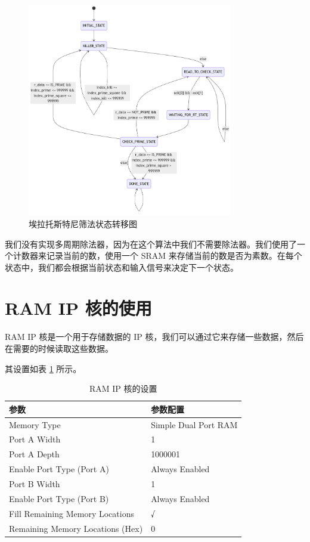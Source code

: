 \documentclass[a4paper]{article}
\begin{document}
\begin{figure}[H]
\centering
\includegraphics[width=0.8\textwidth]{./image/2/state.png}
\caption{埃拉托斯特尼筛法状态转移图}
\label{fig:state.png}
\end{figure}

我们没有实现多周期除法器，因为在这个算法中我们不需要除法器。我们使用了一个计数器来记录当前的数，使用一个 SRAM 来存储当前的数是否为素数。在每个状态中，我们都会根据当前状态和输入信号来决定下一个状态。

\section{RAM IP 核的使用}

RAM IP 核是一个用于存储数据的 IP 核，我们可以通过它来存储一些数据，然后在需要的时候读取这些数据。

其设置如表 \ref{tab:ram} 所示。
\begin{table}[H]
   \centering
   \label{tab:ram}
   \caption{RAM IP 核的设置}
   \begin{tabular}{ll}
      \toprule
      参数 & 参数配置 \\
      \midrule
      Memory Type & Simple Dual Port RAM \\
      Port A Width & 1 \\
      Port A Depth & 1000001 \\
      Enable Port Type (Port A) & Always Enabled \\
      Port B Width & 1 \\
      Enable Port Type (Port B) & Always Enabled \\
      Fill Remaining Memory Locations & √ \\
      Remaining Memory Locations (Hex) & 0 \\
      \bottomrule
   \end{tabular}
\end{table}


% 

% 
% 
\end{document}
